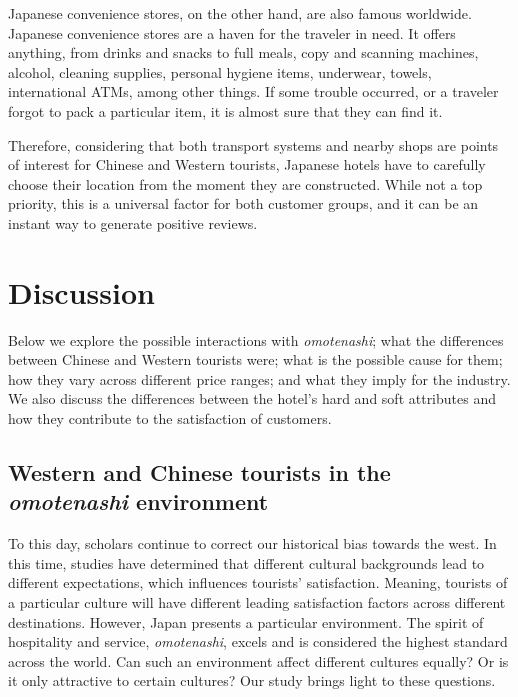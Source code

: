 \documentclass[smallextended,natbib]{svjour3}       %
\begin{document}
    Japanese convenience stores, on the other hand, are also famous worldwide. Japanese convenience stores are a haven for the traveler in need. It offers anything, from drinks and snacks to full meals, copy and scanning machines, alcohol, cleaning supplies, personal hygiene items, underwear, towels, international ATMs, among other things. If some trouble occurred, or a traveler forgot to pack a particular item, it is almost sure that they can find it. 

    Therefore, considering that both transport systems and nearby shops are points of interest for Chinese and Western tourists, Japanese hotels have to carefully choose their location from the moment they are constructed. While not a top priority, this is a universal factor for both customer groups, and it can be an instant way to generate positive reviews.

\section{Discussion}\label{discussion}

  Below we explore the possible interactions with \textit{omotenashi}; what the differences between Chinese and Western tourists were; what is the possible cause for them; how they vary across different price ranges; and what they imply for the industry. We also discuss the differences between the hotel's hard and soft attributes and how they contribute to the satisfaction of customers.

  \subsection{Western and Chinese tourists in the \textit{omotenashi} environment}\label{disc:omotenashi}

    To this day, scholars continue to correct our historical bias towards the west. In this time, studies have determined that different cultural backgrounds lead to different expectations, which influences tourists' satisfaction. Meaning, tourists of a particular culture will have different leading satisfaction factors across different destinations. However, Japan presents a particular environment. The spirit of hospitality and service, \textit{omotenashi}, excels and is considered the highest standard across the world. Can such an environment affect different cultures equally? Or is it only attractive to certain cultures? Our study brings light to these questions.
\end{document}
